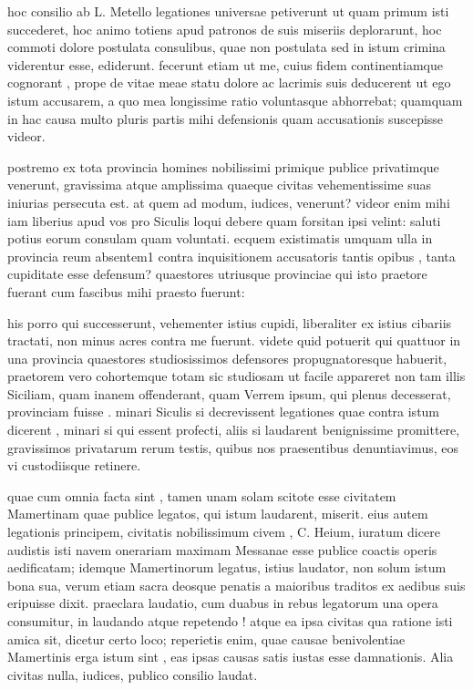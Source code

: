  hoc consilio ab L. Metello legationes universae petiverunt ut quam primum isti succederet, hoc animo totiens apud patronos de suis miseriis deplorarunt, hoc commoti dolore postulata consulibus, quae non postulata sed in istum crimina viderentur esse, ediderunt. fecerunt etiam ut me, cuius fidem continentiamque cognorant , prope de vitae meae statu dolore ac lacrimis suis deducerent ut ego istum accusarem, a quo mea longissime ratio voluntasque abhorrebat; quamquam in hac causa multo pluris partis mihi defensionis quam accusationis suscepisse videor.

 postremo ex tota provincia homines nobilissimi primique publice privatimque venerunt, gravissima atque amplissima quaeque civitas vehementissime suas iniurias persecuta est. at quem ad modum, iudices, venerunt? videor enim mihi iam liberius apud vos pro Siculis loqui debere quam forsitan ipsi velint: saluti potius eorum consulam quam voluntati. ecquem existimatis umquam ulla in provincia reum absentem1 contra inquisitionem accusatoris tantis opibus , tanta cupiditate esse defensum? quaestores utriusque provinciae qui isto praetore fuerant cum fascibus mihi praesto fuerunt:

 his porro qui successerunt, vehementer istius cupidi, liberaliter ex istius cibariis tractati, non minus acres contra me fuerunt. videte quid potuerit qui quattuor in una provincia quaestores studiosissimos defensores propugnatoresque habuerit, praetorem vero cohortemque totam sic studiosam ut facile appareret non tam illis Siciliam, quam inanem offenderant, quam Verrem ipsum, qui plenus decesserat, provinciam fuisse . minari Siculis si decrevissent legationes quae contra istum dicerent , minari si qui essent profecti, aliis si laudarent benignissime promittere, gravissimos privatarum rerum testis, quibus nos praesentibus denuntiavimus, eos vi custodiisque retinere.

 quae cum omnia facta sint , tamen unam solam scitote esse civitatem Mamertinam quae publice legatos, qui istum laudarent, miserit. eius autem legationis principem, civitatis nobilissimum civem , C. Heium, iuratum dicere audistis isti navem onerariam maximam Messanae esse publice coactis operis aedificatam; idemque Mamertinorum legatus, istius laudator, non solum istum bona sua, verum etiam sacra deosque penatis a maioribus traditos ex aedibus suis eripuisse dixit. praeclara laudatio, cum duabus in rebus legatorum una opera consumitur, in laudando atque repetendo ! atque ea ipsa civitas qua ratione isti amica sit, dicetur certo loco; reperietis enim, quae causae benivolentiae Mamertinis erga istum sint , eas ipsas causas satis iustas esse damnationis. Alia civitas nulla, iudices, publico consilio laudat.

